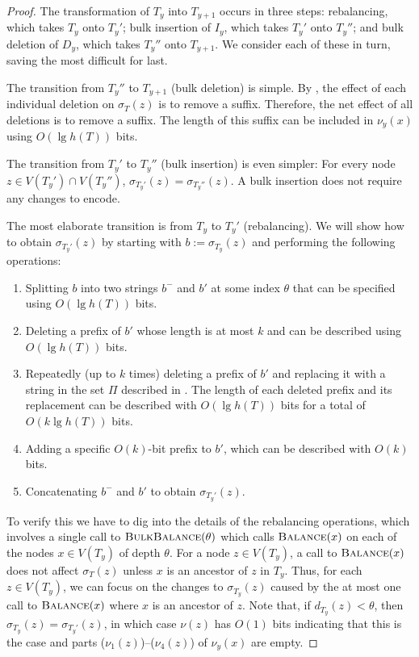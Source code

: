 \documentclass[kpfonts]{patmorin}
\begin{document}
\begin{proof}
  The transformation of $T_{y}$ into $T_{y+1}$ occurs in three steps: rebalancing, which takes $T_y$ onto $T_y'$; bulk insertion of $I_y$, which takes $T_y'$ onto $T_y''$; and bulk deletion of $D_y$, which takes $T_y''$ onto $T_{y+1}$.  We consider each of these in turn, saving the most difficult for last.
  
  The transition from $T_y''$ to $T_{y+1}$ (bulk deletion) is simple.  By , the effect of each individual deletion on $\sigma_T(z)$ is to remove a suffix.  Therefore, the net effect of all deletions is to remove a suffix.  The length of this suffix can be included in $\nu_y(x)$ using $O(\lg h(T))$ bits.
  
  The transition from $T_y'$ to $T_y''$ (bulk insertion) is even simpler: For every node $z\in V(T_y')\cap V(T_y'')$, $\sigma_{T_y'}(z)=\sigma_{T_y''}(z)$.  A bulk insertion does not require any changes to encode.
  
  The most elaborate transition is from $T_y$ to $T_y'$ (rebalancing).  We will show how to obtain $\sigma_{T_y'}(z)$ by starting with $b:=\sigma_{T_y}(z)$ and performing the following operations:
  \begin{enumerate}[($\nu_1$)]
    \item Splitting $b$ into two strings $b^-$ and $b'$ at some index $\theta$ that can be specified using $O(\lg h(T))$ bits.
    \item Deleting a prefix of $b'$ whose length is at most $k$ and can be described using $O(\lg h(T))$ bits.
    \item Repeatedly (up to $k$ times) deleting a prefix of $b'$ and replacing it with a string in the set $\Pi$ described in .  The length of each deleted prefix and its replacement can be described with $O(\lg h(T))$ bits for a total of $O(k\lg h(T))$ bits.
    \item Adding a specific $O(k)$-bit prefix to $b'$, which can be described with $O(k)$ bits.
    \item Concatenating $b^-$ and $b'$ to obtain $\sigma_{T_y'}(z)$.
  \end{enumerate}
  To verify this we have to dig into the details of the rebalancing operations, which involves a single call to $\textsc{BulkBalance}(\theta)$ which calls $\textsc{Balance}(x)$ on each of the nodes $x\in V(T_y)$ of depth $\theta$.    
  For a node $z\in V(T_y)$, a call to $\textsc{Balance}(x)$ does not affect $\sigma_T(z)$ unless $x$ is an ancestor of $z$ in $T_y$.  Thus, for each $z\in V(T_y)$, we can focus on the changes to $\sigma_{T_y}(z)$ caused by the at most one call to $\textsc{Balance}(x)$ where $x$ is an ancestor of $z$. Note that, if $d_{T_y}(z)<\theta$, then $\sigma_{T_y}(z)=\sigma_{T_y'}(z)$, in which case $\nu(z)$ has $O(1)$ bits indicating that this is the case and parts ($\nu_1(z)$)--($\nu_4(z)$) of $\nu_y(x)$ are empty.
  

\end{proof}
\end{document}
